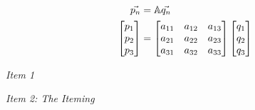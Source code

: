 \documentclass[12pt]{article}
\begin{document}
$$
\begin{aligned}
\vec{p_n} &= \mathbb{A} \vec{q_n}
\\
\begin{bmatrix}
p_1 \\ p_2 \\ p_3
\end{bmatrix}
&=
\begin{bmatrix}
a_{11} & a_{12} & a_{13}
\\ a_{21} & a_{22} & a_{23}
\\ a_{31} & a_{32} & a_{33}
\end{bmatrix}
\begin{bmatrix}
q_1 \\ q_2 \\ q_3
\end{bmatrix}
\end{aligned}
$$

\clearpage


\begin{subproblems}

\item \textit{Item 1} \spacer

\item \textit{Item 2: The Iteming} \spacer

\end{subproblems}
\end{document}
